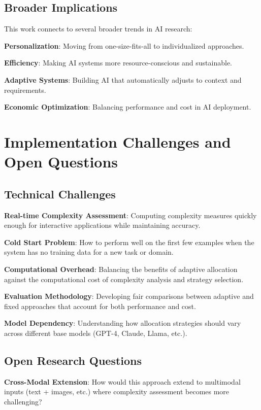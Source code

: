 \documentclass[11pt,a4paper]{article}
\begin{document}
\subsection{Broader Implications}

This work connects to several broader trends in AI research:

\textbf{Personalization}: Moving from one-size-fits-all to individualized approaches.

\textbf{Efficiency}: Making AI systems more resource-conscious and sustainable.

\textbf{Adaptive Systems}: Building AI that automatically adjusts to context and requirements.

\textbf{Economic Optimization}: Balancing performance and cost in AI deployment.

\section{Implementation Challenges and Open Questions}

\subsection{Technical Challenges}

\textbf{Real-time Complexity Assessment}: Computing complexity measures quickly enough for interactive applications while maintaining accuracy.

\textbf{Cold Start Problem}: How to perform well on the first few examples when the system has no training data for a new task or domain.

\textbf{Computational Overhead}: Balancing the benefits of adaptive allocation against the computational cost of complexity analysis and strategy selection.

\textbf{Evaluation Methodology}: Developing fair comparisons between adaptive and fixed approaches that account for both performance and cost.

\textbf{Model Dependency}: Understanding how allocation strategies should vary across different base models (GPT-4, Claude, Llama, etc.).

\subsection{Open Research Questions}

\textbf{Cross-Modal Extension}: How would this approach extend to multimodal inputs (text + images, etc.) where complexity assessment becomes more challenging?
\end{document}
